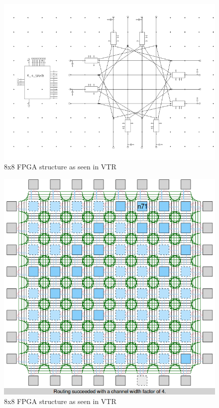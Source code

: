 \begin{figure}[H]
\centering
\includegraphics[scale=0.62]{sm.png}
\caption{8x8 FPGA structure as seen in VTR}
\label{fig:Figure}
\end{figure}

\begin{figure}[H]
\centering
\includegraphics[scale=0.7]{BTP_work/8x8_FPGA.png}
\caption{8x8 FPGA structure as seen in VTR}
\label{fig:Figure}
\end{figure}


